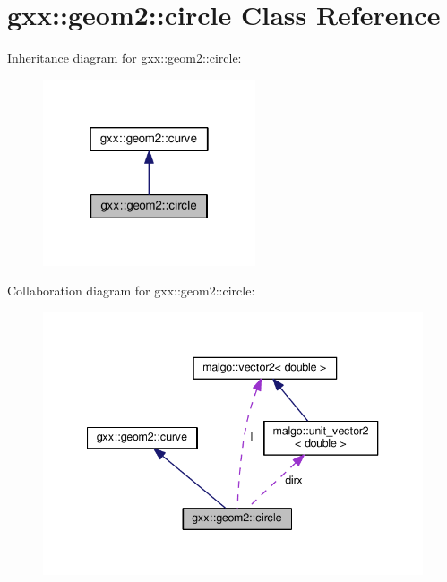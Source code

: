 \hypertarget{classgxx_1_1geom2_1_1circle}{}\section{gxx\+:\+:geom2\+:\+:circle Class Reference}
\label{classgxx_1_1geom2_1_1circle}


Inheritance diagram for gxx\+:\+:geom2\+:\+:circle\+:
\nopagebreak
\begin{figure}[H]
\begin{center}
\leavevmode
\includegraphics[width=178pt]{classgxx_1_1geom2_1_1circle__inherit__graph}
\end{center}
\end{figure}


Collaboration diagram for gxx\+:\+:geom2\+:\+:circle\+:
\nopagebreak
\begin{figure}[H]
\begin{center}
\leavevmode
\includegraphics[width=340pt]{classgxx_1_1geom2_1_1circle__coll__graph}
\end{center}
\end{figure}
